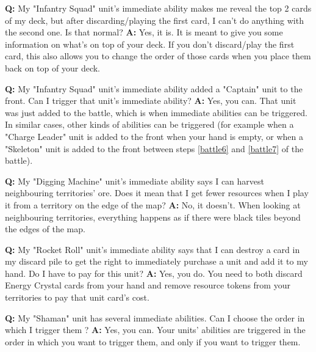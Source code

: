 \documentclass[a4paper]{article}
\begin{document}
    \hspace{-2em}
    \textbf{Q:} My "Infantry Squad" unit's immediate ability makes me reveal
    the top 2 cards of my deck, but after discarding/playing the first card,
    I can't do anything with the second one. Is that normal?
    \newline
    \textbf{A:} Yes, it is. It is meant to give you some information on what's
    on top of your deck. If you don't discard/play the first card,
    this also allows you to change the order of those cards when you place them back
    on top of your deck.

    \hspace{-2em}
    \textbf{Q:} My "Infantry Squad" unit's immediate ability added
    a "Captain" unit to the front. Can I trigger that unit's immediate ability?
    \newline
    \textbf{A:} Yes, you can. That unit was just added to the battle,
    which is when immediate abilities can be triggered.
    In similar cases, other kinds of abilities can be triggered
    (for example when a "Charge Leader" unit is added to the front when your
    hand is empty, or when a "Skeleton" unit is added to the front
    between steps \ref{battle6} and \ref{battle7} of the battle).

    \hspace{-2em}
    \textbf{Q:} My "Digging Machine" unit's immediate ability says I can harvest
    neighbouring territories' ore. Does it mean that I get fewer resources when
    I play it from a territory on the edge of the map?
    \newline
    \textbf{A:} No, it doesn't. When looking at neighbouring territories,
    everything happens as if there were black tiles beyond the edges of the map.

    \hspace{-2em}
    \textbf{Q:} My "Rocket Roll" unit's immediate ability says that I can destroy a card
    in my discard pile to get the right to immediately purchase a unit
    and add it to my hand. Do I have to pay for this unit?
    \newline
    \textbf{A:} Yes, you do.
    You need to both discard Energy Crystal cards from your hand
    and remove resource tokens from your territories to pay that unit card's cost.
    
    \hspace{-2em}
    \textbf{Q:} My "Shaman" unit has several immediate abilities.
    Can I choose the order in which I trigger them ?
    \newline
    \textbf{A:} Yes, you can. Your units' abilities are triggered in the order in which
    you want to trigger them, and only if you want to trigger them.
    
\end{document}
